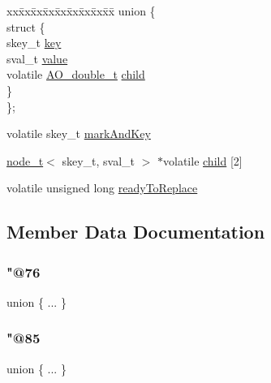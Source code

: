 \begin{DoxyCompactItemize}
\begin{tabbing}
\end{tabbing}\item 
\begin{tabbing}
xx\=xx\=xx\=xx\=xx\=xx\=xx\=xx\=xx\=\kill
union \{\\
\>struct \{\\
\>\>skey\_t \hyperlink{structnode__t_ad38b63280bb7c69e5991653ce673dc35}{key}\\
\>\>sval\_t \hyperlink{structnode__t_afa5c26cdc749c26fcbc550baf6e97717}{value}\\
\>\>volatile \hyperlink{structAO__double__t}{AO\_double\_t} \hyperlink{structnode__t_a87d96c3bd4e3cac7919e7f8878d73d4b}{child}\\
\>\} \\
\}; \\

\end{tabbing}\item 
volatile skey\+\_\+t \hyperlink{structnode__t_a7482a01833d41068cacfdc984ce63f84}{mark\+And\+Key}
\item 
\hyperlink{structnode__t}{node\+\_\+t}$<$ skey\+\_\+t, sval\+\_\+t $>$ $\ast$volatile \hyperlink{structnode__t_a0d79851d85c025ee10dc6fed095ab421}{child} \mbox{[}2\mbox{]}
\item 
volatile unsigned long \hyperlink{structnode__t_a4a510fa3ddecdec5f97dfe6de54209b6}{ready\+To\+Replace}
\end{DoxyCompactItemize}


\subsection{Member Data Documentation}
\mbox{\label{structnode__t_abff9bb0a052c677941162c0a8f7995c8}} 
\subsubsection{\texorpdfstring{"@76}{@76}}
{\footnotesize\ttfamily union \{ ... \} }

\mbox{\label{structnode__t_a10d16db63e9450f23a5fc2333d8ed21f}} 
\subsubsection{\texorpdfstring{"@85}{@85}}
{\footnotesize\ttfamily union \{ ... \} }

\mbox{\label{structnode__t_a70d20051a6cd82f2ca49d0d8293ca9a3}} 
